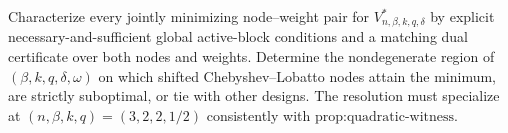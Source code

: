 Characterize every jointly minimizing node--weight pair for \(V^*_{n,\beta,k,q,\delta}\) by explicit necessary-and-sufficient global active-block conditions and a matching dual certificate over both nodes and weights. Determine the nondegenerate region of \((\beta,k,q,\delta,\omega)\) on which shifted Chebyshev--Lobatto nodes attain the minimum, are strictly suboptimal, or tie with other designs. The resolution must specialize at \((n,\beta,k,q)=(3,2,2,1/2)\) consistently with \(\text{prop:quadratic-witness}\).